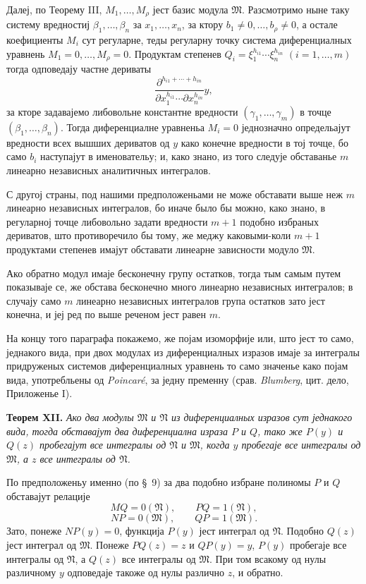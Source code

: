 ﻿\documentclass[11pt]{article}
\begin{document}
Далеј, по Теорему III, \(M_1,
\ldots,M_\rho\) јест базис модула \(\mathfrak M\). Разсмотримо ныне таку систему вредностиј \(\beta_1,
\ldots,\beta_n\) за \(x_1,
\ldots,x_n\), за ктору \(b_1\ne0,
\ldots,b_\rho\ne0\), а остале коефициенты \(M_i\) сут регуларне, теды регуларну точку система диференциалных уравнень \(M_1=0,
\ldots,M_\rho=0\). Продуктам степенев \(Q_i=\xi_1^{h_{i1}}\cdots\xi_n^{h_{in}}\) \((i=1,
\ldots,m)\) тогда одповедају частне дериваты
\[
 \frac{\partial^{h_{i1}+\cdots+h_{in}}}{\partial x_1^{h_{i1}}\cdots\partial x_n^{h_{in}}}y,
\]
за кторе задавајемо либовольне константне вредности \((\gamma_1,
\ldots,\gamma_m)\) в точце \((\beta_1,
\ldots,\beta_n)\). Тогда диференциалне уравненьа \(M_i=0\) једнозначно определьајут вредности всех вышших дериватов од \(y\) како конечне вредности в тој точце, бо само \(b_i\) наступајут в именовательу; и, како знано, из того следује обставанье \(m\) линеарно независных аналитичных интегралов.

С другој страны, под нашими предположеньами не може обставати выше неж \(m\) линеарно независных интегралов, бо иначе было бы можно, како знано, в регуларној точце либовольно задати вредности \(m+1\) подобно избраных дериватов, што противоречило бы тому, же меджу каковыми-коли \(m+1\) продуктами степенев имајут обставати линеарне зависности модуло \(\mathfrak M\).

Ако обратно модул имаје бесконечну групу остатков, тогда тым самым путем показываје се, же обстава бесконечно много линеарно независных интегралов; в случају само \(m\) линеарно независных интегралов група остатков зато јест конечна, и јеј ред по выше реченом јест равен \(m\).

На концу того параграфа покажемо, же појам изоморфије или, што јест то само, једнакого вида, при двох модулах из диференциалных изразов имаје за интегралы придруженых системов диференциалных уравнень то само значенье како појам вида, употребльены од \emph{Poincaré}, за једну пременну (срав. \emph{Blumberg}, цит. дело, Приложенье I).

\textbf{Теорем XII.} \textit{Ако два модулы \(\mathfrak M\) и \(\mathfrak N\) из диференциалных изразов сут једнакого вида, тогда обставајут два диференциална израза \(P\) и \(Q\), тако же \(P(y)\) и \(Q(z)\) пробегајут все интегралы од \(\mathfrak N\) и \(\mathfrak M\), когда \(y\) пробегаје все интегралы од \(\mathfrak M\), а \(z\) все интегралы од \(\mathfrak N\).}

По предположеньу именно (по \S~9) за два подобно избране полиномы \(P\) и \(Q\) обставајут релације
\[
 MQ=0(\mathfrak N),\qquad PQ=1(\mathfrak N),
\]
\[
 NP=0(\mathfrak M),\qquad QP=1(\mathfrak M).
\]
Зато, понеже \(NP(y)=0\), функција \(P(y)\) јест интеграл од \(\mathfrak N\). Подобно \(Q(z)\) јест интеграл од \(\mathfrak M\). Понеже \(PQ(z)=z\) и \(QP(y)=y\), \(P(y)\) пробегаје все интегралы од \(\mathfrak N\), а \(Q(z)\) все интегралы од \(\mathfrak M\). При том всакому од нулы различному \(y\) одповедаје такоже од нулы различно \(z\), и обратно.
\end{document}
